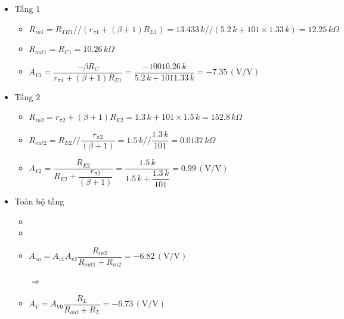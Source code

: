\begin{itemize}[label=-]
	\item Tầng 1
		
		\begin{itemize}[label=+, leftmargin=2cm]
			\item \( R_{in1} = R_{TH1} // (r_{\pi1} + (\beta + 1) R_{E1}) 
			= 13.433\,k // (5.2\,k + 101 \times 1.33\,k) 
			= 12.25\,k\Omega \)
			
			\item \( R_{out1} = R_{C1} = 10.26\,k\Omega \)
			
			\item \( A_{V1} = 
			\dfrac{-\beta  R_C}{r_{\pi1} + (\beta + 1) R_{E1}} 
			= \dfrac{-100  10.26\,k}{5.2\,k + 101  1.33\,k} 
			= -7.35\,(\text{V/V}) \)
		\end{itemize}
		
	\item Tầng 2
	
		\begin{itemize}[label=+, leftmargin=2cm]
			\item \( R_{in2} = r_{\pi2} + (\beta + 1) R_{E2} 
			= 1.3\,k + 101 \times 1.5\,k 
			= 152.8\,k\Omega \)
			
			\item \( R_{out2} = R_{E2} // \dfrac{r_{\pi2}}{(\beta + 1)} 
			= 1.5\,k // \dfrac{1.3\,k}{101} 
			= 0.0137\,k\Omega \)
			
			\item \( A_{V2} = 
			\dfrac{R_{E2}}{R_{E2} + \dfrac{r_{\pi2}}{(\beta + 1)}} 
			= \dfrac{1.5\,k}{1.5\,k + \dfrac{1.3\,k}{101}} 
			= 0.99\,(\text{V/V}) \)
		\end{itemize}
	\item Toàn bộ tầng
	
		\begin{itemize}[label=+, leftmargin=2cm]
			\item {}
			
			\item {}
			
			\item \( A_{vo} = A_{v1} A_{v2} 
			\dfrac{R_{in2}}{R_{out1} + R_{in2}} 
			= -6.82\,(\text{V/V}) \)
			
			$\Rightarrow$ 
			\item \( A_V = A_{V0} 
			\dfrac{R_L}{R_{out} + R_L} 
			= -6.73\,(\text{V/V}) \)
			

\end{itemize}
\end{itemize}
